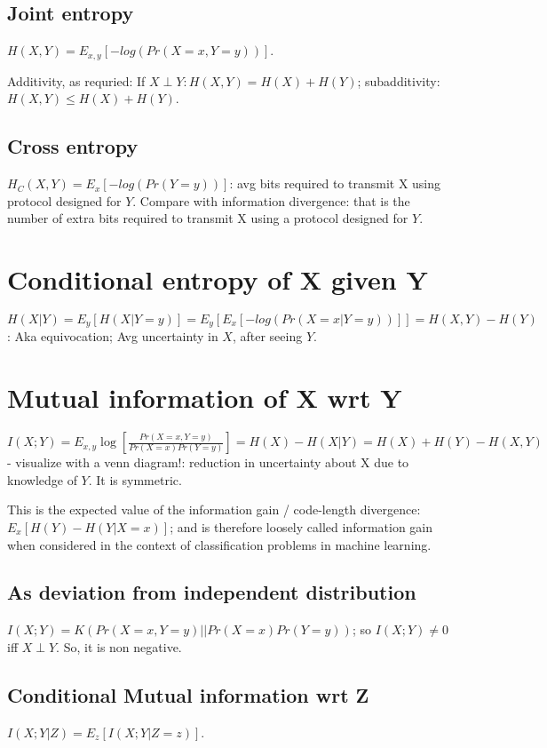 \documentclass[oneside, article]{memoir}
\begin{document}
\subsection{Joint entropy}
$H(X,Y) = E_{x,y}[-log(Pr(X=x, Y=y))]$.

Additivity, as requried: If $X \perp Y: H(X,Y) = H(X) + H(Y)$; subadditivity: $H(X,Y) \leq H(X) + H(Y)$.

\subsection{Cross entropy}
$H_{C}(X,Y) = E_{x}[-log(Pr(Y=y))]$: avg bits required to transmit X using protocol designed for $Y$. Compare with information divergence: that is the number of extra bits required to transmit X using a protocol designed for $Y$.

\section{Conditional entropy of X given Y}
$H(X|Y) = E_{y}[H(X|Y=y)] = E_{y}[E_{x}[-log(Pr(X=x|Y=y))]] = H(X,Y) - H(Y)$: Aka equivocation; Avg uncertainty in $X$, after seeing $Y$.

\section{Mutual information of X wrt Y}
$I(X;Y) = E_{x,y}\log[\frac{Pr(X=x,Y=y)}{Pr(X=x)Pr(Y=y)}] = H(X) - H(X|Y) = H(X) + H(Y) - H(X,Y)$ - visualize with a venn diagram!: reduction in uncertainty about X due to knowledge of $Y$. It is symmetric.

This is the expected value of the information gain / code-length divergence: $E_x[H(Y) - H(Y|X=x)]$; and is therefore loosely called information gain when considered in the context of classification problems in machine learning.

\subsection{As deviation from independent distribution}
$I(X;Y) = K(Pr(X=x,Y=y)||Pr(X=x)Pr(Y=y))$; so $I(X;Y) \neq 0$ iff $X \perp Y$. So, it is non negative.

\subsection{Conditional Mutual information wrt Z}
$I(X;Y|Z) = E_{z}[I(X;Y|Z=z)]$.
\end{document}
